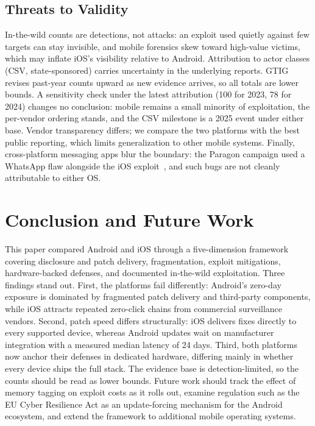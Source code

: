 \documentclass[conference,a4paper]{IEEEtran}
\begin{document}
\subsection{Threats to Validity}\label{sec:threats}
In-the-wild counts are detections, not attacks: an exploit used quietly
against few targets can stay invisible, and mobile forensics skew toward
high-value victims, which may inflate iOS's visibility relative to
Android. Attribution to actor classes (CSV, state-sponsored) carries
uncertainty in the underlying reports. GTIG revises past-year counts
upward as new evidence arrives, so all totals are lower bounds. A
sensitivity check under the latest attribution (100 for 2023, 78 for
2024) changes no conclusion: mobile remains a small minority of
exploitation, the per-vendor ordering stands, and the CSV milestone is a
2025 event under either base. Vendor
transparency differs; we compare the two platforms with the best public
reporting, which limits generalization to other mobile systems. Finally,
cross-platform messaging apps blur the boundary: the Paragon campaign
used a WhatsApp flaw alongside the iOS exploit~\cite{marczak2025graphite},
and such bugs are not cleanly attributable to either OS.

\section{Conclusion and Future Work}
This paper compared Android and iOS through a five-dimension framework
covering disclosure and patch delivery, fragmentation, exploit
mitigations, hardware-backed defenses, and documented in-the-wild
exploitation. Three findings stand out. First, the platforms fail
differently: Android's zero-day exposure is dominated by fragmented patch
delivery and third-party components, while iOS attracts repeated
zero-click chains from commercial surveillance vendors. Second, patch
speed differs structurally: iOS delivers fixes directly to every
supported device, whereas Android updates wait on manufacturer
integration with a measured median latency of 24 days. Third, both
platforms now anchor their defenses in dedicated hardware, differing
mainly in whether every device ships the full stack. The evidence base is
detection-limited, so the counts should be read as lower bounds. Future
work should track the effect of memory tagging on exploit costs as it
rolls out, examine regulation such as the EU Cyber Resilience Act as an
update-forcing mechanism for the Android ecosystem, and extend the
framework to additional mobile operating systems.



\end{document}
